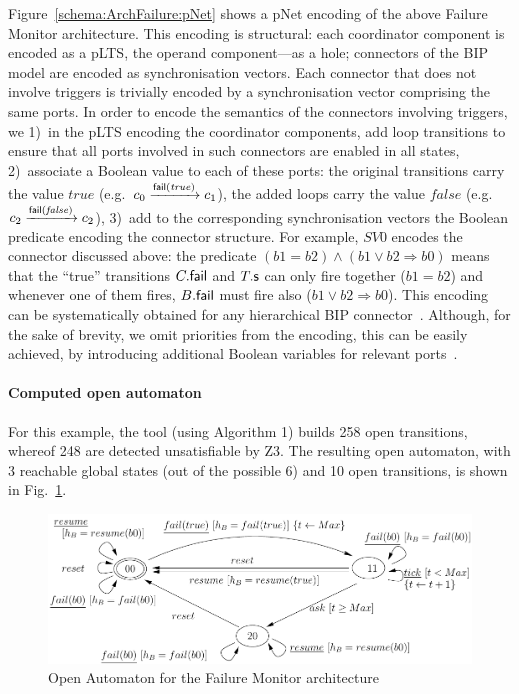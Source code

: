\documentclass[smallcondensed]{svjour3}
\newcommand{\noteEM}[2][color=blue!40, size=\tiny]{\todo[#1]{{\bf Eric: } {#2}}}
\newcommand{\mdash}{---}
\newcommand{\eg}[1][\ ]{e.g.#1}
\newcommand{\goesto}[2][]{\ensuremath{\xrightarrow[#1]{#2}}}
\newcommand{\true}{\ensuremath{\mathit{true}}}
\newcommand{\false}{\ensuremath{\mathit{false}}}
\begin{document}
Figure~\ref{schema:ArchFailure:pNet} shows a pNet encoding of the
above Failure Monitor architecture.  This encoding is structural: each
coordinator component is encoded as a pLTS, the operand
component\mdash as a hole; connectors of the BIP model are encoded as
synchronisation vectors.  Each connector that does not involve
triggers is trivially encoded by a synchronisation vector comprising
the same ports.  In order to encode the semantics of the connectors
involving triggers, we 1)~in the pLTS encoding the coordinator
components, add loop transitions to ensure that all ports involved in
such connectors are enabled in all states, 2)~associate a Boolean
value to each of these ports: the original transitions carry the value
$\true$ (\eg $c_0 \goesto{\PortFail(\true)} c_1$), the
added loops carry the value $\false$ (\eg $c_2
\goesto{\PortFail(\false)} c_2$), 3)~add to the corresponding
synchronisation vectors the Boolean predicate encoding the connector
structure.  For example, $SV0$ encodes the connector discussed above:
the predicate $(b1=b2) \land (b1\lor b2 \Rightarrow b0)$ means that the
``true'' transitions $C.\mathsf{fail}$ and $T.\mathsf{s}$
can only fire together ($b1 = b2$) and whenever one of them fires,
$B.\mathsf{fail}$ must fire also ($b1 \lor b2 \Rightarrow b0$).
This encoding can be systematically obtained for any hierarchical BIP
connector~\cite{BliSif10-causal-fmsd}.
%
\noteEM{Decide later if this is still useful}Although, for the sake of brevity, we omit priorities from the
encoding, this can be easily achieved, by introducing additional
Boolean variables for relevant ports~\cite{BarBliu15-offer-scico}.



\paragraph{Computed open automaton}

For this example, the tool (using Algorithm 1) builds 258 open transitions, whereof 248
are detected unsatisfiable by Z3.  The resulting open automaton, with
3 reachable global states (out of the possible 6) and 10 open
transitions, is shown in Fig.~\ref{schema:resultOA1}.

\begin{figure}[t]
  \centerline{\includegraphics[width=12cm]{ActaXFIG/FailureTimerOA-v2-2}}
  \caption{Open Automaton for the Failure Monitor architecture}
  \label{schema:resultOA1}
\end{figure}
\end{document}
